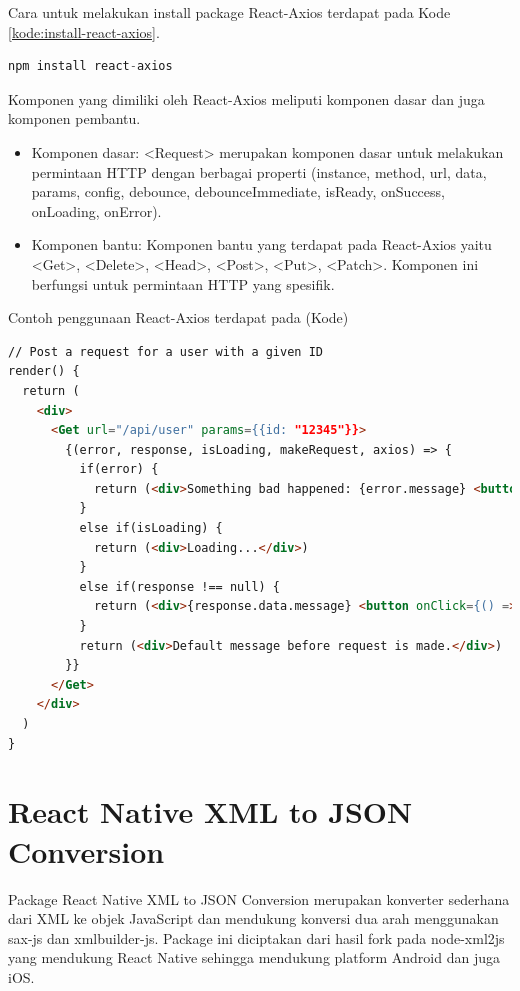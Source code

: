 Cara untuk melakukan install package React-Axios terdapat pada Kode \ref{kode:install-react-axios}.
\begin{lstlisting}[language=Awk, caption=Kode untuk Menginstall Komponen React-Axios, label=kode:install-react-axios]
npm install react-axios
\end{lstlisting}

Komponen yang dimiliki oleh React-Axios meliputi komponen dasar dan juga komponen pembantu.

\begin{itemize}
    \item Komponen dasar: <Request> merupakan komponen dasar untuk melakukan permintaan HTTP dengan berbagai properti (instance, method, url, data, params, config, debounce, debounceImmediate, isReady, onSuccess, onLoading, onError).
    
    \item Komponen bantu: Komponen bantu yang terdapat pada React-Axios yaitu <Get>, <Delete>, <Head>, <Post>, <Put>, <Patch>. Komponen ini berfungsi untuk permintaan HTTP yang spesifik.
\end{itemize}

Contoh penggunaan React-Axios terdapat pada (Kode)

\begin{lstlisting}[language=HTML, caption=Contoh Kode dalam Melakukan GET Menggunakan React-Axios, label=kode:get-example-react-axios]
// Post a request for a user with a given ID
render() {
  return (
    <div>
      <Get url="/api/user" params={{id: "12345"}}>
        {(error, response, isLoading, makeRequest, axios) => {
          if(error) {
            return (<div>Something bad happened: {error.message} <button onClick={() => makeRequest({ params: { reload: true } })}>Retry</button></div>)
          }
          else if(isLoading) {
            return (<div>Loading...</div>)
          }
          else if(response !== null) {
            return (<div>{response.data.message} <button onClick={() => makeRequest({ params: { refresh: true } })}>Refresh</button></div>)
          }
          return (<div>Default message before request is made.</div>)
        }}
      </Get>
    </div>
  )
}
\end{lstlisting}

\section{\texorpdfstring{React Native XML to JSON Conversion~\cite{xml2js-docs}}{React Native XML to JSON Conversion}}
Package React Native XML to JSON Conversion merupakan konverter sederhana dari XML ke objek JavaScript dan mendukung konversi dua arah menggunakan sax-js dan xmlbuilder-js. Package ini diciptakan dari hasil fork pada node-xml2js yang mendukung React Native sehingga mendukung platform Android dan juga iOS. 

